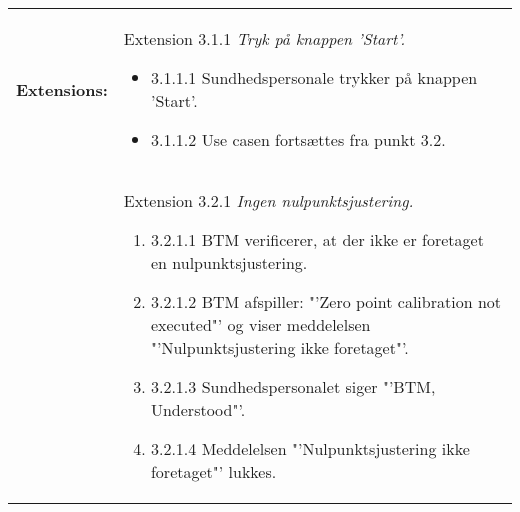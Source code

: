 \begin{table}[H]
\begin{tabular}{|l|p{10cm}|}
\\\hline
\textbf{Extensions:} & Extension 3.1.1 \textit{Tryk på knappen 'Start'.}
\begin{itemize}
\setlength\itemsep{0.1em}
\item[\labelname]3.1.1.1   Sundhedspersonale trykker på knappen 'Start'.
\item[\labelname]3.1.1.2   Use casen fortsættes fra punkt 3.2. 
\end{itemize}
\\
& Extension 3.2.1 \textit{Ingen nulpunktsjustering.}
\begin{enumerate}
\setlength\itemsep{0.1em}
\item[\labelname]3.2.1.1   BTM verificerer, at der ikke er foretaget en nulpunktsjustering. 
\item[\labelname]3.2.1.2   BTM afspiller: "'Zero point calibration not executed"' og viser meddelelsen "'Nulpunktsjustering ikke foretaget"'. 
\item[\labelname]3.2.1.3   Sundhedspersonalet siger "'BTM, Understood"'.
\item[\labelname]3.2.1.4   Meddelelsen "'Nulpunktsjustering ikke foretaget"' lukkes.
\end{enumerate}
\\\hline
\end{tabular}
\end{table}

